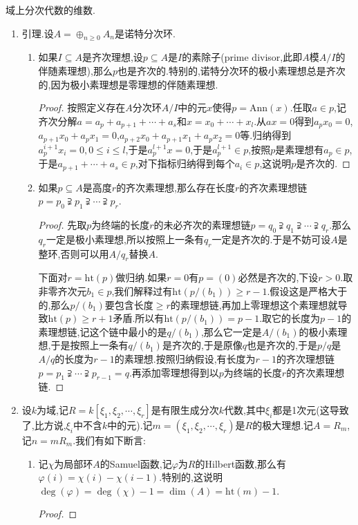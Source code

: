域上分次代数的维数.
\begin{enumerate}
	\item 引理.设$A=\oplus_{n\ge0}A_n$是诺特分次环.
	\begin{enumerate}
		\item 如果$I\subseteq A$是齐次理想,设$p\subseteq A$是$I$的素除子(prime divisor,此即$A$模$A/I$的伴随素理想),那么$p$也是齐次的.特别的,诺特分次环的极小素理想总是齐次的,因为极小素理想是零理想的伴随素理想.
		\begin{proof}
			
			按照定义存在$A$分次环$A/I$中的元$x$使得$p=\mathrm{Ann}(x)$.任取$a\in p$,记齐次分解$a=a_p+a_{p+1}+\cdots+a_s$和$x=x_0+\cdots+x_l$.从$ax=0$得到$a_px_0=0$,$a_{p+1}x_0+a_px_1=0$,$a_{p+2}x_0+a_{p+1}x_1+a_px_2=0$等.归纳得到$a_p^{i+1}x_i=0,0\le i\le l$,于是$a_p^{l+1}x=0$,于是$a_p^{l+1}\in p$,按照$p$是素理想有$a_p\in p$,于是$a_{p+1}+\cdots+a_s\in p$,对下指标归纳得到每个$a_i\in p$,这说明$p$是齐次的.
		\end{proof}
	    \item 如果$p\subseteq A$是高度$r$的齐次素理想,那么存在长度$r$的齐次素理想链$p=p_0\supsetneqq p_1\supsetneqq\cdots\supsetneqq p_r$.
	    \begin{proof}
	    	
	    	先取$p$为终端的长度$r$的未必齐次的素理想链$p=q_0\supsetneqq q_1\supsetneqq\cdots\supsetneqq q_r$.那么$q_r$一定是极小素理想,所以按照上一条有$q_r$一定是齐次的.于是不妨可设$A$是整环,否则可以用$A/q_r$替换$A$.
	    	
	    	\qquad
	    	
	    	下面对$r=\mathrm{ht}(p)$做归纳.如果$r=0$有$p=(0)$必然是齐次的,下设$r>0$.取非零齐次元$b_1\in p$,我们解释过有$\mathrm{ht}(p/(b_1))\ge r-1$.假设这是严格大于的,那么$p/(b_1)$要包含长度$\ge r$的素理想链,再加上零理想这个素理想就导致$\mathrm{ht}(p)\ge r+1$矛盾.所以有$\mathrm{ht}(p/(b_1))=p-1$.取它的长度为$p-1$的素理想链,记这个链中最小的是$q/(b_1)$,那么它一定是$A/(b_1)$的极小素理想,于是按照上一条有$q/(b_1)$是齐次的,于是原像$q$也是齐次的,于是$p/q$是$A/q$的长度为$r-1$的素理想.按照归纳假设,有长度为$r-1$的齐次理想链$p=p_1\supsetneqq\cdots\supsetneqq p_{r-1}=q$.再添加零理想得到以$p$为终端的长度$r$的齐次素理想链.
	    \end{proof}
	\end{enumerate}
    \item 设$k$为域,记$R=k[\xi_1,\xi_2,\cdots,\xi_r]$是有限生成分次$k$代数,其中$\xi_i$都是1次元(这导致了,比方说,$\xi_i$中不含$k$中的元).记$m=(\xi_1,\xi_2,\cdots,\xi_r)$是$R$的极大理想.记$A=R_m$,记$n=mR_m$.我们有如下断言:
    \begin{enumerate}
    	\item 记$\chi$为局部环$A$的Samuel函数,记$\varphi$为$R$的Hilbert函数,那么有$\varphi(i)=\chi(i)-\chi(i-1)$.特别的,这说明$\deg(\varphi)=\deg(\chi)-1=\dim(A)=\mathrm{ht}(m)-1$.
    	\begin{proof}
    		

\end{proof}
\end{enumerate}
\end{enumerate}
